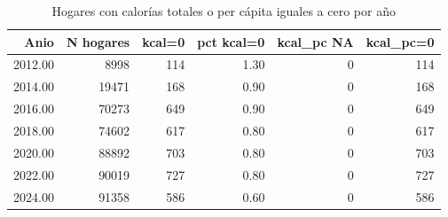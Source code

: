 \begin{table}[ht]
\centering
\caption{Hogares con calor\'ias totales o per c\'apita iguales a cero por a\~{n}o} 
\label{tab:05_hogares_kcal_cero}
\begin{tabular}{rrrrrr}
  \toprule
Anio & N hogares & kcal=0 & pct kcal=0 & kcal_pc NA & kcal_pc=0 \\ 
  \midrule
2012.00 & 8998 & 114 & 1.30 &   0 & 114 \\ 
  2014.00 & 19471 & 168 & 0.90 &   0 & 168 \\ 
  2016.00 & 70273 & 649 & 0.90 &   0 & 649 \\ 
  2018.00 & 74602 & 617 & 0.80 &   0 & 617 \\ 
  2020.00 & 88892 & 703 & 0.80 &   0 & 703 \\ 
  2022.00 & 90019 & 727 & 0.80 &   0 & 727 \\ 
  2024.00 & 91358 & 586 & 0.60 &   0 & 586 \\ 
   \bottomrule
\end{tabular}
\end{table}
